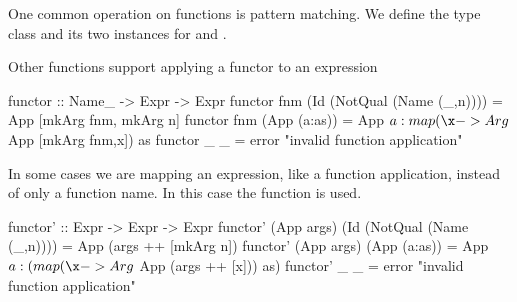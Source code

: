 One common operation on functions is pattern matching. We define the type class  and its two instances for  and . 

Other functions support applying a functor to an expression 
\begin{hscode}
functor :: Name_ -> Expr -> Expr
functor fnm (Id (NotQual (Name (_,n)))) = App [mkArg fnm, mkArg n]
functor fnm (App (a:as)) = App $ a : map (\x -> Arg $ App [mkArg fnm,x]) as
functor _ _ = error "invalid function application" 
\end{hscode}
In some cases we are mapping an expression, like a function application, instead of only a function name. In this case the function  is used. 
\begin{hscode}
functor' :: Expr -> Expr -> Expr
functor' (App args) (Id (NotQual (Name (_,n)))) = 
  App (args ++ [mkArg n])
functor' (App args) (App (a:as)) = 
  App $ a : (map (\x -> Arg $ App (args ++ [x])) as)
functor' _ _ = error "invalid function application" 
\end{hscode}

